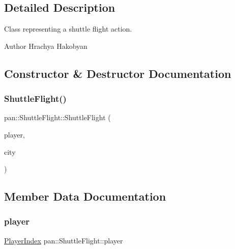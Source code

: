 \subsection{Detailed Description}
Class representing a shuttle flight action. 

\begin{DoxyAuthor}{Author}
Hrachya Hakobyan 
\end{DoxyAuthor}


\subsection{Constructor \& Destructor Documentation}
\mbox{\label{classpan_1_1_shuttle_flight_af5deefa81bd19d0fd0776a43c045067a}} 
\subsubsection{\texorpdfstring{Shuttle\+Flight()}{ShuttleFlight()}}
{\footnotesize\ttfamily pan\+::\+Shuttle\+Flight\+::\+Shuttle\+Flight (\begin{DoxyParamCaption}\item[{\hyperlink{namespacepan_a0cdabf874fbf1bb3a1f0152d108c2909}{Player\+Index}}]{player,  }\item[{\hyperlink{namespacepan_afaed28aa6603153dcc062a028602d697}{City\+Index}}]{city }\end{DoxyParamCaption})}



\subsection{Member Data Documentation}
\mbox{\label{classpan_1_1_shuttle_flight_a50cd09f3860cdfb821d676dd59c09949}} 
\subsubsection{\texorpdfstring{player}{player}}
{\footnotesize\ttfamily \hyperlink{namespacepan_a0cdabf874fbf1bb3a1f0152d108c2909}{Player\+Index} pan\+::\+Shuttle\+Flight\+::player}

